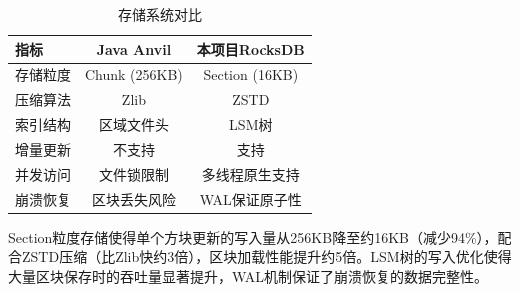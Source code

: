 \begin{table}[h]
\centering
\caption{存储系统对比}
\label{tab:storage_comparison}
\begin{tabular}{lcc}
\toprule
\textbf{指标} & \textbf{Java Anvil} & \textbf{本项目RocksDB} \\
\midrule
存储粒度 & Chunk (256KB) & Section (16KB) \\
压缩算法 & Zlib & ZSTD \\
索引结构 & 区域文件头 & LSM树 \\
增量更新 & 不支持 & 支持 \\
并发访问 & 文件锁限制 & 多线程原生支持 \\
崩溃恢复 & 区块丢失风险 & WAL保证原子性 \\
\bottomrule
\end{tabular}
\end{table}

Section粒度存储使得单个方块更新的写入量从256KB降至约16KB（减少94\%），配合ZSTD压缩（比Zlib快约3倍），区块加载性能提升约5倍。LSM树的写入优化使得大量区块保存时的吞吐量显著提升，WAL机制保证了崩溃恢复的数据完整性。
